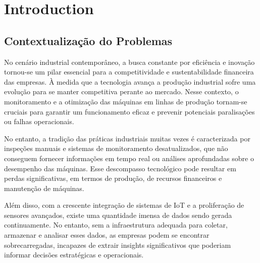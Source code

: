 \chapter{Introduction}\label{cap:intro}



\section[Contextualização do Problemas]{Contextualização do Problemas}


No cenário industrial contemporâneo, a busca constante por eficiência e inovação tornou-se um pilar essencial para a competitividade e sustentabilidade financeira das empresas. À medida que a tecnologia avança a produção industrial sofre uma evolução para se manter competitiva perante ao mercado. Nesse contexto, o monitoramento e a otimização das máquinas em linhas de produção tornam-se cruciais para garantir um funcionamento eficaz e prevenir potenciais paralisações ou falhas operacionais.

No entanto, a tradição das práticas industriais muitas vezes é caracterizada por inspeções manuais e sistemas de monitoramento desatualizados, que não conseguem fornecer informações em tempo real ou análises aprofundadas sobre o desempenho das máquinas. Esse descompasso tecnológico pode resultar em perdas significativas, em termos de produção, de recursos financeiros e manutenção de máquinas.

Além disso, com a crescente integração de sistemas de IoT e a proliferação de sensores avançados, existe uma quantidade imensa de dados sendo gerada continuamente. No entanto, sem a infraestrutura adequada para coletar, armazenar e analisar esses dados, as empresas podem se encontrar sobrecarregadas, incapazes de extrair insights significativos que poderiam informar decisões estratégicas e operacionais.


